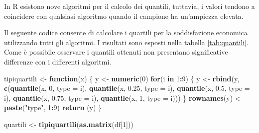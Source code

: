 \documentclass[]{book}
\newenvironment{Shaded}{\begin{snugshade}}{\end{snugshade}}
\newcommand{\KeywordTok}[1]{\textcolor[rgb]{0.13,0.29,0.53}{\textbf{#1}}}
\newcommand{\DataTypeTok}[1]{\textcolor[rgb]{0.13,0.29,0.53}{#1}}
\newcommand{\DecValTok}[1]{\textcolor[rgb]{0.00,0.00,0.81}{#1}}
\newcommand{\FloatTok}[1]{\textcolor[rgb]{0.00,0.00,0.81}{#1}}
\newcommand{\StringTok}[1]{\textcolor[rgb]{0.31,0.60,0.02}{#1}}
\newcommand{\ControlFlowTok}[1]{\textcolor[rgb]{0.13,0.29,0.53}{\textbf{#1}}}
\newcommand{\OperatorTok}[1]{\textcolor[rgb]{0.81,0.36,0.00}{\textbf{#1}}}
\newcommand{\NormalTok}[1]{#1}
\begin{document}
In R esistono nove algoritmi per il calcolo dei quantili, tuttavia, i
valori tendono a coincidere con qualsiasi algoritmo quando il campione
ha un'ampiezza elevata.

Il seguente codice consente di calcolare i quartili per la soddisfazione
economica utilizzando tutti gli algoritmi. I risultati sono esposti
nella tabella \ref{tab:quantili}. Come è possibile osservare i quantili
ottenuti non presentano significative differenze con i differenti
algoritmi.

\begin{Shaded}
\begin{Highlighting}[]
\NormalTok{tipiquartili <-}\StringTok{ }\ControlFlowTok{function}\NormalTok{(x) \{}
\NormalTok{  y <-}\StringTok{ }\KeywordTok{numeric}\NormalTok{(}\DecValTok{0}\NormalTok{)}
  \ControlFlowTok{for}\NormalTok{(i }\ControlFlowTok{in} \DecValTok{1}\OperatorTok{:}\DecValTok{9}\NormalTok{) \{}
\NormalTok{    y <-}\StringTok{ }\KeywordTok{rbind}\NormalTok{(y, }\KeywordTok{c}\NormalTok{(}\KeywordTok{quantile}\NormalTok{(x, }\DecValTok{0}\NormalTok{, }\DataTypeTok{type =}\NormalTok{ i),}
                    \KeywordTok{quantile}\NormalTok{(x, }\FloatTok{0.25}\NormalTok{, }\DataTypeTok{type =}\NormalTok{ i),}
                    \KeywordTok{quantile}\NormalTok{(x, }\FloatTok{0.5}\NormalTok{, }\DataTypeTok{type =}\NormalTok{ i),}
                    \KeywordTok{quantile}\NormalTok{(x, }\FloatTok{0.75}\NormalTok{, }\DataTypeTok{type =}\NormalTok{ i),}
                    \KeywordTok{quantile}\NormalTok{(x, }\DecValTok{1}\NormalTok{, }\DataTypeTok{type =}\NormalTok{ i)))}
\NormalTok{  \}}
  \KeywordTok{rownames}\NormalTok{(y) <-}\StringTok{ }\KeywordTok{paste}\NormalTok{(}\StringTok{"type"}\NormalTok{, }\DecValTok{1}\OperatorTok{:}\DecValTok{9}\NormalTok{)}
  \KeywordTok{return}\NormalTok{ (y)}
\NormalTok{\}}

\NormalTok{quartili <-}\StringTok{ }\KeywordTok{tipiquartili}\NormalTok{(}\KeywordTok{as.matrix}\NormalTok{(df[}\DecValTok{1}\NormalTok{]))}
\end{Highlighting}
\end{Shaded}
\end{document}
